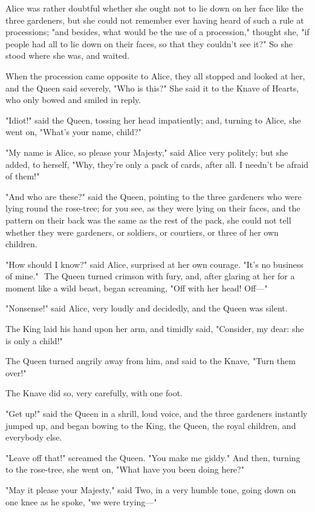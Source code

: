 Alice was rather doubtful whether she ought not to lie down on her face like the three gardeners, but she could not remember ever having heard of such a rule at processions; "and besides, what would be the use of a procession," thought she, "if people had all to lie down on their faces, so that they couldn't see it?" So she stood where she was, and waited.

​When the procession came opposite to Alice, they all stopped and looked at her, and the Queen said severely, "Who is this?" She said it to the Knave of Hearts, who only bowed and smiled in reply.

"Idiot!" said the Queen, tossing her head impatiently; and, turning to Alice, she went on, "What's your name, child?"

"My name is Alice, so please your Majesty," said Alice very politely; but she added, to herself, "Why, they're only a pack of cards, after all. I needn't be afraid of them!"

"And who are these?" said the Queen, pointing to the three gardeners who were lying round the rose-tree; for you see, as they were lying on their faces, and the pattern on their back was the same as the rest of the pack, she could not tell whether they were gardeners, or soldiers, or courtiers, or three of her own children.

"How should I know?" said Alice, surprised at her own courage. "It's no business of mine."
​
The Queen turned crimson with fury, and, after glaring at her for a moment like a wild beast, began screaming, "Off with her head! Off—"

​"Nonsense!" said Alice, very loudly and decidedly, and the Queen was silent.

The King laid his hand upon her arm, and timidly said, "Consider, my dear: she is only a child!"

The Queen turned angrily away from him, and said to the Knave, "Turn them over!"

The Knave did so, very carefully, with one foot.

"Get up!" said the Queen in a shrill, loud voice, and the three gardeners instantly jumped up, and began bowing to the King, the Queen, the royal children, and everybody else.

"Leave off that!" screamed the Queen. "You make me giddy." And then, turning to the rose-tree, she went on, "What have you been doing here?"

"May it please your Majesty," said Two, in a very humble tone, going down on one knee as he spoke, "we were trying—"

